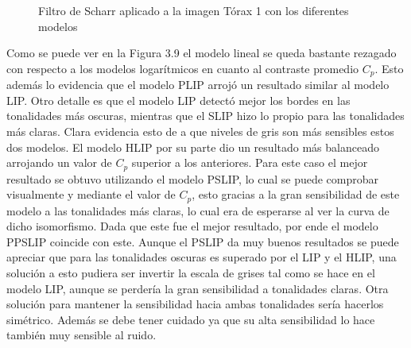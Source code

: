 \begin{figure}
\begin{center}
		\caption{Filtro de Scharr aplicado a la imagen T\'orax 1 con los diferentes modelos}
	\end{center}
\end{figure} 

Como se puede ver en la Figura 3.9 el modelo lineal se queda bastante rezagado con respecto a los modelos logar\'itmicos en cuanto al contraste promedio $C_p$. Esto adem\'as lo evidencia que el modelo PLIP arroj\'o un resultado similar al modelo LIP. Otro detalle es que el modelo LIP detect\'o mejor los bordes en las tonalidades m\'as oscuras, mientras que el SLIP hizo lo propio para las tonalidades m\'as claras. Clara evidencia esto de a que niveles de gris son m\'as sensibles estos dos modelos. El modelo HLIP por su parte dio un resultado m\'as balanceado arrojando un valor de $C_p$ superior a los anteriores. Para este caso el mejor resultado se obtuvo utilizando el modelo PSLIP, lo cual se puede comprobar visualmente y mediante el valor de $C_p$, esto gracias a la gran sensibilidad de este modelo a las tonalidades m\'as claras, lo cual era de esperarse al ver la curva de dicho isomorfismo. Dada que este fue el mejor resultado, por ende el modelo PPSLIP coincide con este. Aunque el PSLIP da muy buenos resultados se puede apreciar que para las tonalidades oscuras es superado por el LIP y el HLIP, una soluci\'on a esto pudiera ser invertir la escala de grises tal como se hace en el modelo LIP, aunque se perder\'ia la gran sensibilidad a tonalidades claras. Otra soluci\'on para mantener la sensibilidad hacia ambas tonalidades ser\'ia hacerlos sim\'etrico. Adem\'as se debe tener cuidado ya que su alta sensibilidad lo hace tambi\'en muy sensible al ruido.

